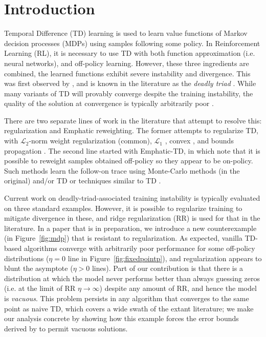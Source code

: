 \documentclass[11pt]{article}
\begin{document}
\vfill

\clearpage

\tableofcontents

\clearpage

\section{Introduction}

Temporal Difference (TD) learning is used to learn value functions of Markov decision processes (MDPs) using samples following some policy. In Reinforcement Learning (RL), it is necessary to use TD with both function approximation (i.e. neural networks), and off-policy learning. However, these three ingredients are combined, the learned functions exhibit severe instability and divergence. This was first observed by \citet{tsitsiklis1996analysis}, and is known in the literature as the \emph{deadly triad} \cite[p.~264]{sutton2020reinforcement}. While many variants of TD will provably converge despite the training instability, the quality of the solution at convergence is typically arbitrarily poor \citep{kolter2011fixed}.

There are two separate lines of work in the literature that attempt to resolve this: regularization and Emphatic reweighting.
The former attempts to regularize TD, with $\mathcal L_2$-norm weight regularization (common), $\mathcal L_1$ \citep{mahadevan2014proximal}, convex \citep{yu2017convergence}, and bounds propagation \citep{kumar2020discor}.
The second line started with Emphatic-TD, in which \citet{sutton2016emphatic} note that it is possible to reweight samples obtained off-policy so they appear to be on-policy. Such methods learn the follow-on trace using Monte-Carlo methods (in the original) and/or TD \citep{jiang2021learning,zhang2020provably} or techniques similar to TD \citep{hasselt2021expected}.

Current work on deadly-triad-associated training instability is typically evaluated on three standard examples. However, it is possible to regularize training to mitigate divergence in these, and ridge regularization (RR) is used for that in the literature.
In a paper that is in preparation, we introduce a new counterexample (in Figure~\ref{fig:mdp}) that is resistant to regularization. As expected, vanilla TD-based algorithms converge with arbitrarily poor performance for some off-policy distributions ($\eta=0$ line in Figure~\ref{fig:fixedpointp}), and regularization appears to blunt the asymptote ($\eta > 0$ lines). Part of our contribution is that there is a distribution at which the model never performs better than always guessing zeros (i.e. at the limit of RR $\eta\to\infty$) despite any amount of RR, and hence the model is \emph{vacuous}. This problem persists in any algorithm that converges to the same point as naive TD, which covers a wide swath of the extant literature; we make our analysis concrete by showing how this example forces the error bounds derived by \citet{zhang2021breaking} to permit vacuous solutions.
\end{document}
